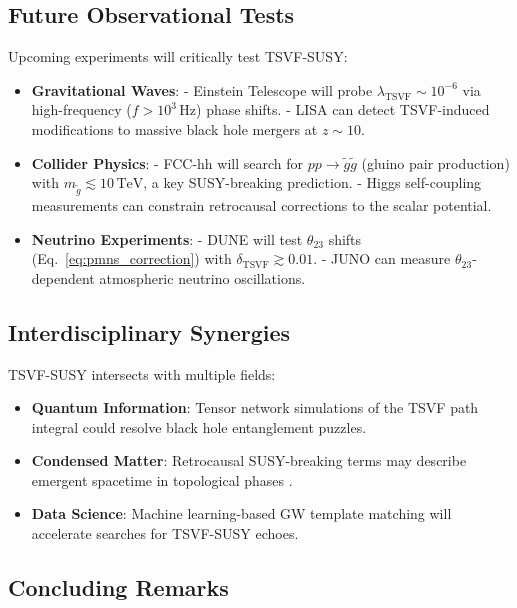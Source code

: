 \documentclass[twocolumn,superscriptaddress,floatfix]{revtex4-2}
\begin{document}
\subsection{Future Observational Tests}  
\label{subsec:future_obs}  

Upcoming experiments will critically test TSVF-SUSY:  
\begin{itemize}  
\item \textbf{Gravitational Waves}:  
  - Einstein Telescope \cite{Punturo2010} will probe \(\lambda_{\text{TSVF}} \sim 10^{-6}\) via high-frequency (\(f > 10^3 \, \text{Hz}\)) phase shifts.  
  - LISA \cite{Amaro-Seoane2017} can detect TSVF-induced modifications to massive black hole mergers at \(z \sim 10\).  
\item \textbf{Collider Physics}:  
  - FCC-hh \cite{Abada2019} will search for \(pp \to \tilde{g}\tilde{g}\) (gluino pair production) with \(m_{\tilde{g}} \lesssim 10 \, \text{TeV}\), a key SUSY-breaking prediction.  
  - Higgs self-coupling measurements \cite{deBlas2020} can constrain retrocausal corrections to the scalar potential.  
\item \textbf{Neutrino Experiments}:  
  - DUNE \cite{Abi2021} will test \(\theta_{23}\) shifts (Eq.~\ref{eq:pmns_correction}) with \(\delta_{\text{TSVF}} \gtrsim 0.01\).  
  - JUNO \cite{An2016} can measure \(\theta_{23}\)-dependent atmospheric neutrino oscillations.  
\end{itemize}  

\subsection{Interdisciplinary Synergies}  
\label{subsec:interdisciplinary}  

TSVF-SUSY intersects with multiple fields:  
\begin{itemize}  
\item \textbf{Quantum Information}: Tensor network simulations \cite{Swingle2012} of the TSVF path integral could resolve black hole entanglement puzzles.  
\item \textbf{Condensed Matter}: Retrocausal SUSY-breaking terms may describe emergent spacetime in topological phases \cite{Vishwanath2015}.  
\item \textbf{Data Science}: Machine learning-based GW template matching \cite{George2018} will accelerate searches for TSVF-SUSY echoes.  
\end{itemize}  

\subsection{Concluding Remarks}  
\end{document}
